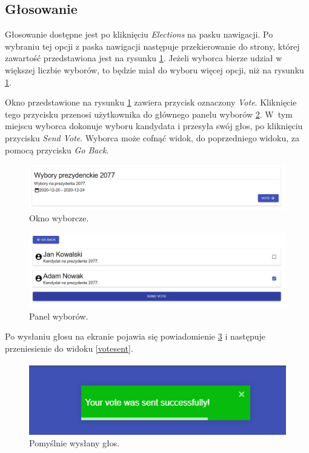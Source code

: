 \documentclass[a4paper,12pt]{book}
\begin{document}
\newpage

\subsection{Głosowanie}

Głosowanie dostępne jest po kliknięciu \textit{Elections} na pasku nawigacji. Po wybraniu tej opcji z paska nawigacji następuje przekierowanie do strony, której zawartość przedstawiona jest na rysunku \ref{electionwindow}. Jeżeli wyborca bierze udział w większej liczbie wyborów, to będzie miał do wyboru więcej opcji, niż na rysunku \ref{electionwindow}.

Okno  przedstawione na rysunku \ref{electionwindow} zawiera przycisk oznaczony \textit{Vote}. Kliknięcie tego przycisku przenosi użytkownika do głównego panelu wyborów \ref{votescreen}. W~tym miejscu wyborca dokonuje wyboru kandydata i przesyła swój głos, po kliknięciu przycisku \textit{Send Vote}. Wyborca może cofnąć widok, do poprzedniego widoku, za pomocą przycisku \textit{Go Back}.

\begin{figure}[H]
	\centering
	\includegraphics[width=\textwidth]{images/electionwindow.png}
	\caption{Okno wyborcze.}\label{electionwindow}
\end {figure}

\begin{figure}[H]
	\centering
	\includegraphics[width=\textwidth]{images/votescreen.png}
	\caption{Panel wyborów.}\label{votescreen}
\end {figure}

Po wysłaniu głosu na ekranie pojawia się powiadomienie \ref{votesuccess} i następuje przeniesienie do widoku \ref{votesent}.

\begin{figure}[H]
	\centering
	\includegraphics{images/votesuccess.png}
	\caption{Pomyślnie wysłany głos.}\label{votesuccess}
\end {figure}
\end{document}
